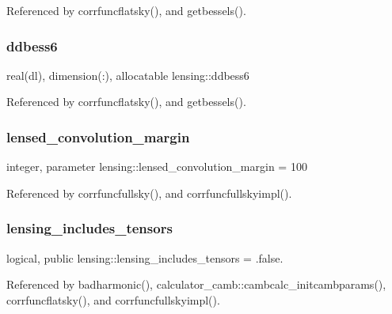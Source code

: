 Referenced by corrfuncflatsky(), and getbessels().

\mbox{\label{namespacelensing_aae19084149f8642419ba2ae3f6b82b76}} 
\subsubsection{\texorpdfstring{ddbess6}{ddbess6}}
{\footnotesize\ttfamily real(dl), dimension(\+:), allocatable lensing\+::ddbess6\hspace{0.3cm}{\ttfamily [private]}}



Referenced by corrfuncflatsky(), and getbessels().

\mbox{\label{namespacelensing_ae086e70cafd6706bebf9c49e4faa88e5}} 
\subsubsection{\texorpdfstring{lensed\+\_\+convolution\+\_\+margin}{lensed\_convolution\_margin}}
{\footnotesize\ttfamily integer, parameter lensing\+::lensed\+\_\+convolution\+\_\+margin = 100\hspace{0.3cm}{\ttfamily [private]}}



Referenced by corrfuncfullsky(), and corrfuncfullskyimpl().

\mbox{\label{namespacelensing_acdb3e1d4390cc8b027cd17aeb1669c93}} 
\subsubsection{\texorpdfstring{lensing\+\_\+includes\+\_\+tensors}{lensing\_includes\_tensors}}
{\footnotesize\ttfamily logical, public lensing\+::lensing\+\_\+includes\+\_\+tensors = .false.}



Referenced by badharmonic(), calculator\+\_\+camb\+::cambcalc\+\_\+initcambparams(), corrfuncflatsky(), and corrfuncfullskyimpl().

